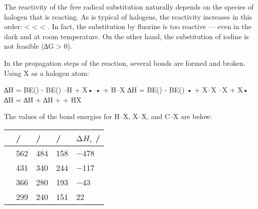				The reactivity of the free radical substitution naturally depends on the species of halogen that is reacting.
				As is typical of halogens, the reactivity increases in this order:  <  <  < .
				In fact, the substitution by fluorine is too reactive --- even in the dark and at room temperature. On the other hand,
				the substitution of iodine is not feasible (∆G > 0).

				In the propagation steps of the reaction, several bonds are formed and broken. Using X as a halogen atom:

				\vspace{1em}
				\vbox{∆H = BE() - BE()		\tabto{60mm}–H + X•		\tabto{85mm} \ch{->} • + H–X	}
				\vbox{∆H = BE() - BE()		\tabto{60mm}• + X–X		\tabto{85mm} \ch{->} –X + X•	}
				\vbox{∆H = ∆H + ∆H	\tabto{60mm} + 	\tabto{85mm} \ch{->}  + HX	}

				The values of the bond energies for H–X, X–X, and C–X are below:
				\vspace{1.0em}

				\begin{center}\begin{table}[htb]\renewcommand{\arraystretch}{1.5}
				\begin{tabu} to \textwidth {X[c,m] | X[c,m] | X[c,m] | X[c,m] | X[c,m]}

					&\ch{H-X} / \si{\kJmol}	& / \si{\kJmol}	& / \si{\kJmol}	&$∆H_{r}$ / \si{\kJmol}\\ \hline

							&	\num{562}	&	\num{484}	&	\num{158}	&	\num{-478}							\\	\hline
						&	\num{431}	&	\num{340}	&	\num{244}	&	\num{-117}							\\	\hline
						&	\num{366}	&	\num{280}	&	\num{193}	&	\num{-43}							\\	\hline
							&	\num{299}	&	\num{240}	&	\num{151}	&	\num[retain-explicit-plus]{+22}		\\	\hline

				\end{tabu}
				\end{table}\end{center}


